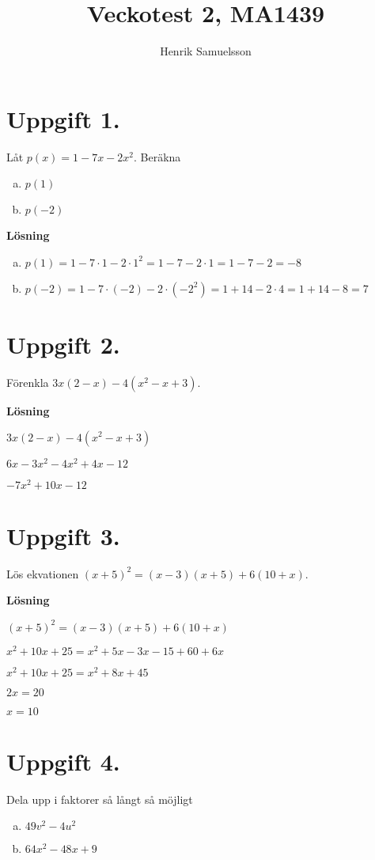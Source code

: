 \documentclass{article}
\begin{document}
\title{Veckotest 2, MA1439}
\author{Henrik Samuelsson}
\maketitle

\section*{Uppgift 1.} 
Låt $p(x)=1-7x-2x^2$. Beräkna

\begin{enumerate}[(a)]
\item $p(1)$
\item $p(-2)$
\end{enumerate}

\textbf{Lösning}

\begin{enumerate}[(a)]
\item $p(1) = 1 - 7 \cdot 1 - 2 \cdot 1^2 = 1 - 7 - 2 \cdot 1 = 1 - 7 - 2 = -8$
\item $p(-2)= 1 - 7 \cdot (-2) - 2 \cdot (-2^2) = 1 + 14 - 2\cdot 4 = 1 + 14 - 8 = 7$
\end{enumerate}

\section*{Uppgift 2.} 
Förenkla $3x(2-x)-4(x^2-x+3)$.

\textbf{Lösning}

$3x(2-x)-4(x^2-x+3)$

$6x-3x^2-4x^2+4x-12$

$-7x^2+10x-12$

\section*{Uppgift 3.} 
Lös ekvationen $(x+5)^2=(x-3)(x+5)+6(10+x)$.

\textbf{Lösning}

$(x+5)^2=(x-3)(x+5)+6(10+x)$

$x^2+10x+25=x^2+5x-3x-15+60+6x$

$x^2+10x+25=x^2+8x+45$

$2x=20$

$x=10$

\section*{Uppgift 4.} 
Dela upp i faktorer så långt så möjligt
\begin{enumerate}[(a)]
\item $49v^2-4u^2$
\item $64x^2-48x+9$
\end{enumerate}
\end{document}
